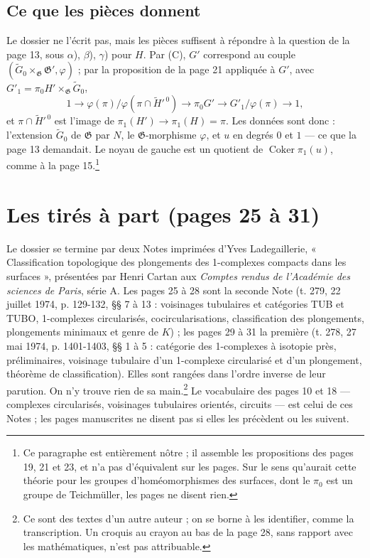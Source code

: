 \documentclass[11pt,a4paper]{article}
\begin{document}
\subsection*{Ce que les pièces donnent}

Le dossier ne l'écrit pas, mais les pièces suffisent à répondre à la question
de la page 13, sous $\alpha$), $\beta$), $\gamma$) pour $H$. Par (C),
$G'$ correspond au couple $(\widetilde{G}_0 \times_{\mathfrak{G}}
\mathfrak{G}', \varphi)$ ; par la proposition de la page 21 appliquée à
$G'$, avec $G'_1 = \pi_0 H' \times_{\mathfrak{G}} \widetilde{G}_0$,
\[
  1 \longrightarrow \varphi(\pi) / \varphi(\pi \cap \widetilde{H}'^{\,0})
  \longrightarrow \pi_0 G' \longrightarrow G'_1 / \varphi(\pi)
  \longrightarrow 1 ,
\]
et $\pi \cap \widetilde{H}'^{\,0}$ est l'image de $\pi_1(H') \to \pi_1(H) =
\pi$. Les données sont donc : l'extension $\widetilde{G}_0$ de $\mathfrak{G}$
par $N$, le $\mathfrak{G}$-morphisme $\varphi$, et $u$ en degrés $0$ et $1$ —
ce que la page 13 demandait. Le noyau de gauche est un quotient de
$\operatorname{Coker} \pi_1(u)$, comme à la page 15.\footnote{Ce paragraphe
est entièrement nôtre ; il assemble les propositions des pages 19, 21 et 23,
et n'a pas d'équivalent sur les pages. Sur le sens qu'aurait cette théorie
pour les groupes d'homéomorphismes des surfaces, dont le $\pi_0$ est un
groupe de Teichmüller, les pages ne disent rien.}

\section*{Les tirés à part (pages 25 à 31)}

Le dossier se termine par deux Notes imprimées d'Yves Ladegaillerie,
« Classification topologique des plongements des 1-complexes compacts dans
les surfaces », présentées par Henri Cartan aux \emph{Comptes rendus de
l'Académie des sciences de Paris}, série A. Les pages 25 à 28 sont la seconde
Note (t. 279, 22 juillet 1974, p. 129-132, §§ 7 à 13 : voisinages tubulaires
et catégories TUB et TUBO, 1-complexes circularisés, cocircularisations,
classification des plongements, plongements minimaux et genre de $K$) ; les
pages 29 à 31 la première (t. 278, 27 mai 1974, p. 1401-1403, §§ 1 à 5 :
catégorie des 1-complexes à isotopie près, préliminaires, voisinage tubulaire
d'un 1-complexe circularisé et d'un plongement, théorème de classification).
Elles sont rangées dans l'ordre inverse de leur parution. On n'y trouve rien
de sa main.\footnote{Ce sont des textes d'un autre auteur ; on se borne à
les identifier, comme la transcription. Un croquis au crayon au bas de la
page 28, sans rapport avec les mathématiques, n'est pas attribuable.} Le
vocabulaire des pages 10 et 18 — complexes circularisés, voisinages
tubulaires orientés, circuits — est celui de ces Notes ; les pages
manuscrites ne disent pas si elles les précèdent ou les suivent.
\end{document}
